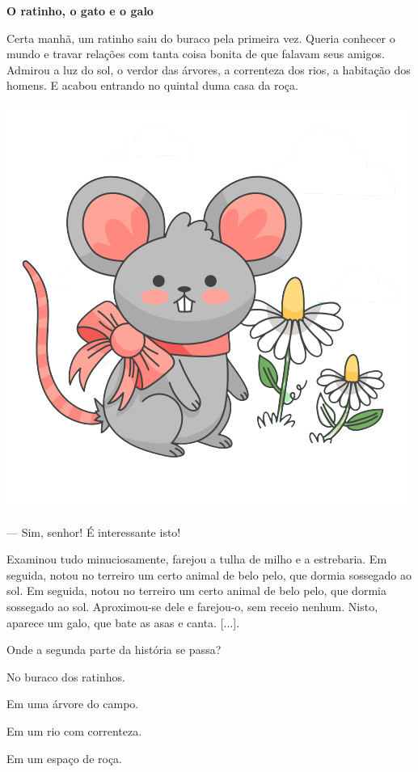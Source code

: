 \begin{myquote}
\textbf{O ratinho, o gato e o galo}

Certa manhã, um ratinho saiu do buraco pela primeira vez. Queria
conhecer o mundo e travar relações com tanta coisa bonita de que falavam
seus amigos. Admirou a luz do sol, o verdor das árvores, a correnteza
dos rios, a habitação dos homens. E acabou entrando no quintal duma casa
da roça.

\begin{center}
\includegraphics[width=.5\textwidth]{./media/image1d.png}
\end{center}

--- Sim, senhor! É interessante isto!

Examinou tudo minuciosamente, farejou a tulha de milho e a estrebaria.
Em seguida, notou no terreiro um certo animal de belo pelo, que dormia
sossegado ao sol. Em seguida, notou no terreiro um certo animal de belo
pelo, que dormia sossegado ao sol. Aproximou-se dele e farejou-o, sem
receio nenhum. Nisto, aparece um galo, que bate as asas e canta.
{[}...{]}.

\end{myquote}

\pagebreak
Onde a segunda parte da história se passa?

\begin{escolha}[itemsep=-5pt]
\item No buraco dos ratinhos.

\item Em uma árvore do campo.

\item Em um rio com correnteza.

\item Em um espaço de roça.
\end{escolha}



